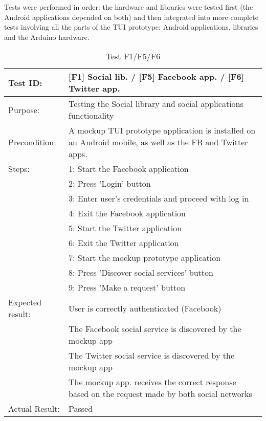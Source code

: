 Tests were performed in order: the hardware and libraries were tested first
(the Android applications depended on both) and then integrated into more
complete tests involving all the parts of the TUI prototype: Android
applications, libraries and the Arduino hardware.


\begin{table}[h!]
\begin{tabular}{|l|p{10cm}|}
\hline Test ID: &		[F1] Social lib. / [F5] Facebook app. / [F6] Twitter app.\\
\hline Purpose: &		Testing the Social library and social applications
						functionality \\
\hline Precondition: &	A mockup TUI prototype application is installed on an
						Android mobile, as well as the FB and Twitter apps. \\
\hline
Steps:
 & 1: Start the Facebook application \\
 & 2: Press 'Login' button \\
 & 3: Enter user's credentials and proceed with log in \\
 & 4: Exit the Facebook application \\
 & 5: Start the Twitter application \\
 & 6: Exit the Twitter application \\
 & 7: Start the mockup prototype application \\
 & 8: Press 'Discover social services' button \\
 & 9: Press 'Make a request' button \\
\hline
Expected result:
 & User is correctly authenticated (Facebook) \\
 & The Facebook social service is discovered by the mockup app \\
 & The Twitter social service is discovered by the mockup app \\
 & The mockup app. receives the correct response based on the request made by
	both social networks \\
\hline
Actual Result:
 & Passed \\
\hline
\end{tabular}
\caption{Test F1/F5/F6}
\end{table}


